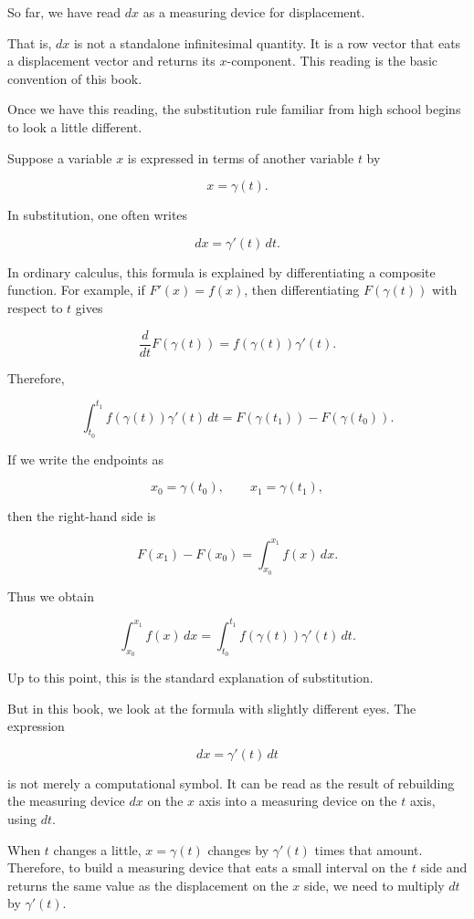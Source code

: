 \documentclass[a4paper,12pt,openany]{book}
\begin{document}
So far, we have read \(dx\) as a measuring device for displacement.

That is, \(dx\) is not a standalone infinitesimal quantity. It is a row
vector that eats a displacement vector and returns its \(x\)-component.
This reading is the basic convention of this book.

Once we have this reading, the substitution rule familiar from high
school begins to look a little different.

Suppose a variable \(x\) is expressed in terms of another variable \(t\)
by

\[
x=\gamma(t).
\]

In substitution, one often writes

\[
dx=\gamma'(t)\,dt.
\]

In ordinary calculus, this formula is explained by differentiating a
composite function. For example, if \(F'(x)=f(x)\), then differentiating
\(F(\gamma(t))\) with respect to \(t\) gives

\[
\frac{d}{dt}F(\gamma(t))=f(\gamma(t))\gamma'(t).
\]

Therefore,

\[
\int_{t_0}^{t_1}f(\gamma(t))\gamma'(t)\,dt
=F(\gamma(t_1))-F(\gamma(t_0)).
\]

If we write the endpoints as

\[
x_0=\gamma(t_0),\qquad x_1=\gamma(t_1),
\]

then the right-hand side is

\[
F(x_1)-F(x_0)=\int_{x_0}^{x_1}f(x)\,dx.
\]

Thus we obtain

\[
\int_{x_0}^{x_1}f(x)\,dx
=
\int_{t_0}^{t_1}f(\gamma(t))\gamma'(t)\,dt.
\]

Up to this point, this is the standard explanation of substitution.

But in this book, we look at the formula with slightly different eyes.
The expression

\[
dx=\gamma'(t)\,dt
\]

is not merely a computational symbol. It can be read as the result of
rebuilding the measuring device \(dx\) on the \(x\) axis into a
measuring device on the \(t\) axis, using \(dt\).

When \(t\) changes a little, \(x=\gamma(t)\) changes by \(\gamma'(t)\)
times that amount. Therefore, to build a measuring device that eats a
small interval on the \(t\) side and returns the same value as the
displacement on the \(x\) side, we need to multiply \(dt\) by
\(\gamma'(t)\).
\end{document}
